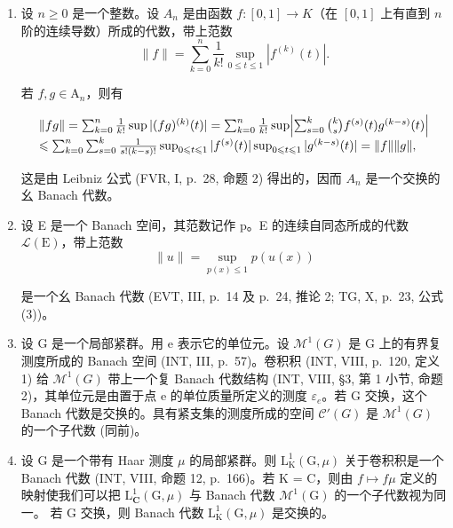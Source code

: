 \begin{enumerate}
此后假定 X 不是紧的。于是代数 \(\mathcal{C}_{0}(X;K)\) 不是幺的；由它添加单位元而得到的代数与子代数 \(K \cdot 1 \oplus \mathcal{C}_{0}(X;K)\)（\(\mathcal{C}(X;K)\) 的由在无穷远处有极限的函数所成的子代数）视为同一。这个子代数的一个元素可逆必须且只需它不为零且它在无穷远处的极限非零。由此得出，对每个 \(f \in \mathcal{C}_{0}(X;K)\)，f 的谱等于 \(f(X) \cup \{0\}\)。

\(f \in \mathcal{K}(\mathrm{X};\mathrm{K})\) 的谱等于 \(f(\mathrm{X})\)（事实上，若 \(\mathrm{X}\) 不是紧的，则 0 属于 \(f(\mathrm{X})\)）。

\item
  设 \(n \geqslant 0\) 是一个整数。设 \(A_{n}\) 是由函数 \(f: [0,1] \to K\)（在 \([0,1]\) 上有直到 \(n\) 阶的连续导数）所成的代数，带上范数
\[
\| f \| = \sum_ {k = 0} ^ {n} \frac {1}{k !} \sup _ {0 \leqslant t \leqslant 1} | f ^ {(k)} (t) |.
\]

若 \(f,g\in \mathrm{A}_n\)，则有

\[
\begin{array}{l} \| f g \| = \sum_ {k = 0} ^ {n} \frac {1}{k !} \sup | (f g) ^ {(k)} (t) | = \sum_ {k = 0} ^ {n} \frac {1}{k !} \sup \Bigl | \sum_ {s = 0} ^ {k} \binom {k} {s} f ^ {(s)} (t) g ^ {(k - s)} (t) \Bigr | \\ \leqslant \sum_ {k = 0} ^ {n} \sum_ {s = 0} ^ {k} \frac {1}{s ! (k - s) !} \sup _ {0 \leqslant t \leqslant 1} | f ^ {(s)} (t) | \sup _ {0 \leqslant t \leqslant 1} | g ^ {(k - s)} (t) | = \| f \|   \| g \|, \end{array}
\]

这是由 Leibniz 公式 (FVR, I, p.~28, 命题 2) 得出的，因而 \(A_{n}\) 是一个交换的幺 Banach 代数。

\item
  设 E 是一个 Banach 空间，其范数记作 p。E 的连续自同态所成的代数 \(\mathcal{L}(\mathrm{E})\)，带上范数
\[
\| u \| = \sup _ {p (x) \leqslant 1} p (u (x))
\]

是一个幺 Banach 代数 (EVT, III, p.~14 及 p.~24, 推论 2; TG, X, p.~23, 公式 (3))。

\item
  设 G 是一个局部紧群。用 e 表示它的单位元。设 \(\mathcal{M}^{1}(G)\) 是 G 上的有界复测度所成的 Banach 空间 (INT, III, p.~57)。卷积积 (INT, VIII, p.~120, 定义 1) 给 \(\mathcal{M}^{1}(G)\) 带上一个复 Banach 代数结构 (INT, VIII, §3, 第 1 小节, 命题 2)，其单位元是由置于点 e 的单位质量所定义的测度 \(\varepsilon_{e}\)。若 G 交换，这个 Banach 代数是交换的。具有紧支集的测度所成的空间 \(\mathcal{C}'(G)\) 是 \(\mathcal{M}^{1}(G)\) 的一个子代数 (同前)。
\item
  设 G 是一个带有 Haar 测度 \(\mu\) 的局部紧群。则 \(\mathrm{L}_{\mathrm{K}}^{1}(\mathrm{G},\mu)\) 关于卷积积是一个 Banach 代数 (INT, VIII, 命题 12, p.~166)。若 K = C，则由 \(f \mapsto f \mu\) 定义的映射使我们可以把 \(\mathrm{L}_{\mathbf{C}}^{1}(\mathrm{G},\mu)\) 与 Banach 代数 \(\mathcal{M}^{1}(\mathrm{G})\) 的一个子代数视为同一。
若 G 交换，则 Banach 代数 \(\mathrm{L}_{\mathrm{K}}^{1}(\mathrm{G},\mu)\) 是交换的。


\end{enumerate}
